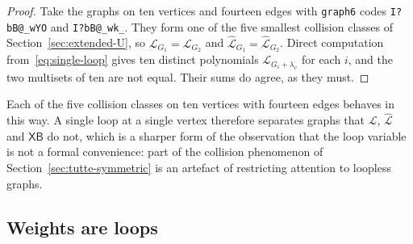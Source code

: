 \documentclass[11pt]{article}
\theoremstyle{plain}
\theoremstyle{definition}
\renewcommand{\mathcal}{\mathscr}
\newcommand{\LL}{\mathcal{L}}    %
\newcommand{\XB}{\mathsf{XB}} %
\numberwithin{equation}{section}
\begin{document}
\begin{proof}
Take the graphs on ten vertices and fourteen edges with \texttt{graph6}
codes \verb+I?bB@_wYO+ and \verb+I?bB@_wk_+.  They form one of the five
smallest collision classes of Section~\ref{sec:extended-U}, so
$\LL_{G_1}=\LL_{G_2}$ and $\widehat{\LL}_{G_1}=\widehat{\LL}_{G_2}$.  Direct
computation from~\eqref{eq:single-loop} gives ten distinct polynomials
$\LL_{G_i+\lambda_v}$ for each $i$, and the two multisets of ten are not
equal.  Their sums do agree, as they must.
\end{proof}

Each of the five collision classes on ten vertices with fourteen edges
behaves in this way.  A single loop at a single vertex therefore separates
graphs that $\LL$, $\widehat{\LL}$ and $\XB$ do not, which is a sharper form
of the observation that the loop variable is not a formal convenience:
part of the collision phenomenon of Section~\ref{sec:tutte-symmetric} is an
artefact of restricting attention to loopless graphs.

\subsection{Weights are loops}\label{subsec:weights}
\end{document}
